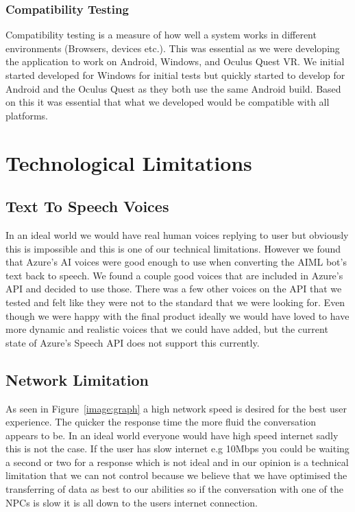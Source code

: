 \subsubsection{Compatibility Testing}
Compatibility testing is a measure of how well a system works in different environments (Browsers, devices etc.). This was essential as we were developing the application to work on Android, Windows, and Oculus Quest VR. We initial started developed for Windows for initial tests but quickly started to develop for Android and the Oculus Quest as they both use the same Android build. Based on this it was essential that what we developed would be compatible with all platforms.

\section{Technological Limitations}
\subsection{Text To Speech Voices}
In an ideal world we would have real human voices replying to user but obviously this is impossible and this  is one of our technical limitations. However we found that Azure's AI voices were good enough to use when converting the AIML bot's text back to speech. We found a couple good voices that are included in Azure's API and decided to use those. There was a few other voices on the API that we tested and felt like they were not to the standard that we were looking for. Even though we were happy with the final product ideally we would have loved to have more dynamic and realistic voices that we could have added, but the current state of Azure's Speech API does not support this currently.

\subsection{Network Limitation}
As seen in Figure~\ref{image:graph} a high network speed is desired for the best user experience. The quicker the response time the more fluid the conversation appears to be. In an ideal world everyone would have high speed internet sadly this is not the case. If the user has slow internet e.g 10Mbps you could be waiting a second or two for a response which is not ideal and in our opinion is a technical limitation that we can not control because we believe that we have optimised the transferring of data as best to our abilities so if the conversation with one of the NPCs is slow it is all down to the users internet connection. 

